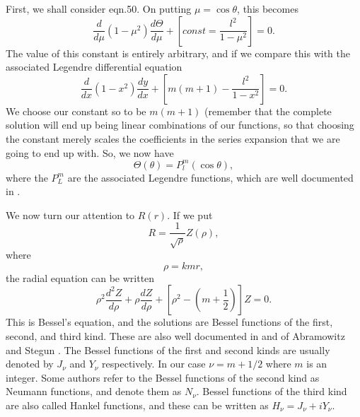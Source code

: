 First, we shall consider eqn.50. On putting $\mu=\cos \theta$, this becomes
\begin{equation}
\frac{d}{ d \mu} (1-\mu^2) \frac{ d \Theta}{d \mu}
+ \left \lbrack const=\frac{l^2}{1 -\mu^2} \right \rbrack=0.
\end{equation}
The value of this constant is entirely arbitrary, and if we compare this with the associated Legendre differential equation \cite{AbramowitzStegun:Mybib}
\begin{equation}
\frac{d}{ d x} (1-x^2) \frac{ d y}{d x}
+ \left \lbrack m(m+1)-\frac{l^2}{1 -x^2} \right \rbrack=0.
\end{equation}
We choose our constant so to be $m(m+1)$ (remember that the complete solution will end up being linear combinations of our functions, so that choosing the constant merely scales the coefficients in the series expansion that we are going to end up with. So, we now have
\begin{equation}
\Theta(\theta)=P^m_l(\cos \theta),
\end{equation}
where the $P^m_L$ are the associated Legendre functions, which are well documented in \cite{AbramowitzStegun:Mybib}.

We now turn our attention to $R(r)$. If we put
\begin{equation}
R=\frac{1}{\sqrt{\rho}} Z(\rho), 
\end{equation}
where
\begin{equation}
\rho=kmr,
\end{equation}
the radial equation can be written
\begin{equation}
\rho^2 \frac{d^2 Z}{d \rho}
+\rho \frac{d Z}{d \rho}+
\left \lbrack \rho^2- \left ( m+\frac{1}{2} \right ) \right \rbrack Z=0.
\end{equation}
This is Bessel's equation, and the solutions are Bessel functions of
the first,  second, and third  kind. These are also well documented in
 and  of Abramowitz and Stegun 
\cite{AbramowitzStegun:Mybib}.
The Bessel functions of the first and second kinds are usually denoted by
$J_\nu$ and $Y_\nu$ respectively. In our case $\nu=m+1/2$ where $m$ is an integer. Some authors refer to the Bessel functions of the second kind as Neumann functions, and denote them as $N_\nu$. Bessel functions of the third kind are also
called Hankel functions, and these can be written as $H_\nu=J_\nu+i Y_\nu$.

